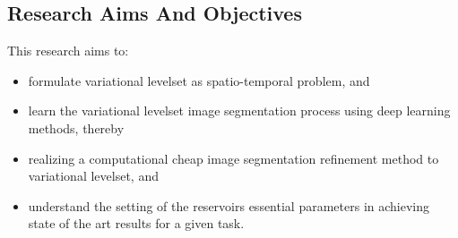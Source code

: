 \documentclass{WitsPhysicsReport}
\begin{document}









\subsection{Research Aims And Objectives}
\label{sec:research_aims_and_objectives}
This research aims to:
\begin{itemize}
    \item formulate variational levelset as spatio-temporal problem, and
    \item learn the variational levelset image segmentation process using deep learning methods, thereby 
    \item realizing a computational cheap image segmentation refinement method to variational levelset, and 
    \item understand the setting of the reservoirs essential parameters in achieving state of the art results for a given task. 
\end{itemize}
\end{document}
